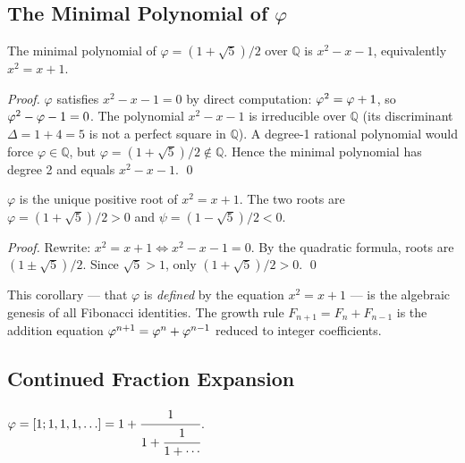 \subsection{The Minimal Polynomial of \(\varphi\)}\label{subsec:ch7-minimal}

\begin{theorem}\label{thm:minimal-poly}
The minimal polynomial of \(\varphi = (1+\sqrt{5})/2\) over \(\mathbb{Q}\)
is \(x^2 - x - 1\), equivalently \(x^2 = x + 1\).
\end{theorem}

\begin{proof}
\(\varphi\) satisfies \(x^2 - x - 1 = 0\) by direct computation:
\(\varphi^{2} = \varphi + 1\), so \(\varphi^{2} - \varphi - 1 = 0\).
The polynomial \(x^2 - x - 1\) is irreducible over \(\mathbb{Q}\) (its
discriminant \(\Delta = 1 + 4 = 5\) is not a perfect square in \(\mathbb{Q}\)).
A degree-1 rational polynomial would force \(\varphi \in \mathbb{Q}\), but
\(\varphi = (1+\sqrt{5})/2 \notin \mathbb{Q}\).  Hence the minimal polynomial
has degree 2 and equals \(x^2 - x - 1\).
\qed
\end{proof}

\begin{corollary}[Golden ratio as root of \(x^2 = x+1\)]\label{cor:golden-root}
\(\varphi\) is the unique positive root of \(x^2 = x + 1\).
The two roots are \(\varphi = (1+\sqrt{5})/2 > 0\) and
\(\psi = (1-\sqrt{5})/2 < 0\).
\end{corollary}

\begin{proof}
Rewrite: \(x^2 = x + 1 \Leftrightarrow x^2 - x - 1 = 0\).
By the quadratic formula, roots are \((1 \pm \sqrt{5})/2\).
Since \(\sqrt{5} > 1\), only \((1+\sqrt{5})/2 > 0\).
\qed
\end{proof}

This corollary — that \(\varphi\) is \emph{defined} by the equation
\(x^2 = x + 1\) — is the algebraic genesis of all Fibonacci identities.
The growth rule \(F_{n+1} = F_n + F_{n-1}\) is the addition equation
\(\varphi^{n+1} = \varphi^{n} + \varphi^{n-1}\) reduced to integer coefficients.

\subsection{Continued Fraction Expansion}\label{subsec:ch7-cf}

\begin{proposition}\label{prop:cf}
\(\varphi = [1; 1, 1, 1, \ldots] = 1 + \cfrac{1}{1+\cfrac{1}{1+\cdots}}\).
\end{proposition}


